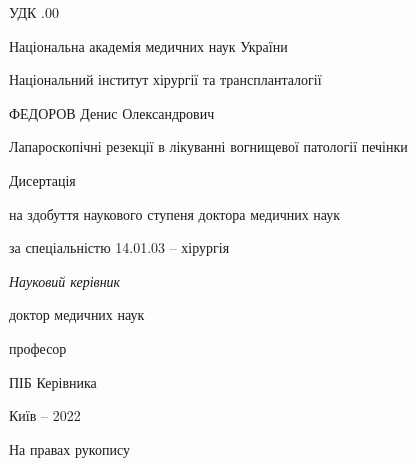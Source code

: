 \documentclass[a4paper,14pt]{extreport}
\begin{document}


\frontmatter 

\thispagestyle{empty}

УДК .00

 \begin{centering}
  \linespread{1.1}
  \vspace{2em}

{Національна академія медичних наук України

Національний інститут хірургії та транспланталогії}

  \vspace{5em}

ФЕДОРОВ Денис Олександрович

  \vspace{2em}

Лапароскопічні резекції в лікуванні вогнищевої патології печінки

  \vspace{5em}


Дисертація 

на здобуття наукового ступеня доктора медичних наук

за спеціальністю 14.01.03 -- хірургія


  \vspace{2em}

\textit{Науковий керівник}

доктор медичних наук

професор

ПІБ Керівника

\vspace{11em}

  Київ -- 2022

 \end{centering}
\begin{flushright}
 На правах рукопису
\end{flushright} 

\tableofcontents





\mainmatter %



\backmatter
\end{document}
